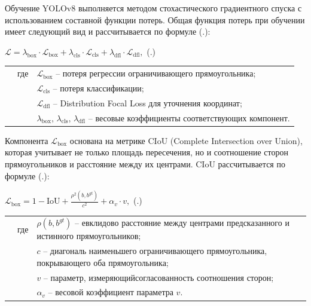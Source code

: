 {\gostFont

  \par \redline Обучение YOLOv8 выполняется методом стохастического градиентного спуска с использованием составной функции потерь. Общая функция потерь при обучении имеет следующий вид и рассчитывается по формуле (\thechaptercntr .\theformulacntr):

  \formulaspace 
  \par \redline $\mathcal{L} = \lambda_{\mathrm{box}} \cdot \mathcal{L}_{\mathrm{box}} + \lambda_{\mathrm{cls}} \cdot \mathcal{L}_{\mathrm{cls}} + \lambda_{\mathrm{dfl}} \cdot \mathcal{L}_{\mathrm{dfl}},$
  \hfill (\thechaptercntr .\theformulacntr) \hspace*{-0.5cm}\redline
  \formulaspace \addtocounter{formulacntr}{1}

  \begin{tabular}{p{0.875cm}p{0.3cm}p{15.175cm}}
      & где  & $\mathcal{L}_{\mathrm{box}}$ {--} потеря регрессии ограничивающего прямоугольника; \\
      &      & $\mathcal{L}_{\mathrm{cls}}$ {--} потеря классификации; \\
      &      & $\mathcal{L}_{\mathrm{dfl}}$ {--} Distribution Focal Loss для уточнения координат; \\
      &      & $\lambda_{\mathrm{box}},\,\lambda_{\mathrm{cls}},\,\lambda_{\mathrm{dfl}}$ {--} весовые коэффициенты соответствующих компонент. \\
  \end{tabular}
  \vspace{13pt}

  \par \redline Компонента $\mathcal{L}_{\mathrm{box}}$ основана на метрике CIoU (Complete Intersection over Union), которая учитывает не только площадь пересечения, но и соотношение сторон прямоугольников и расстояние между их центрами. CIoU рассчитывается по формуле (\thechaptercntr .\theformulacntr):

  \formulaspace 
  \par \redline $\mathcal{L}_{\mathrm{box}} = 1 - \mathrm{IoU} + \frac{\rho^2(b, b^{gt})}{c^2} + \alpha_v \cdot v,$
  \hfill (\thechaptercntr .\theformulacntr) \hspace*{-0.5cm}\redline
  \formulaspace \addtocounter{formulacntr}{1}

  \begin{tabular}{p{0.875cm}p{0.3cm}p{15.175cm}}
      & где  & $\rho(b, b^{gt})$ {--} евклидово расстояние между центрами предсказанного и истинного прямоугольников; \\
      &      & $c$ {--} диагональ наименьшего ограничивающего прямоугольника, покрывающего оба прямоугольника; \\
      &      & $v$ {--} параметр, измеряющийсогласованность соотношения сторон; \\
      &      & $\alpha_v$ {--} весовой коэффициент параметра $v$. \\
  \end{tabular}
  \vspace{13pt}

}
